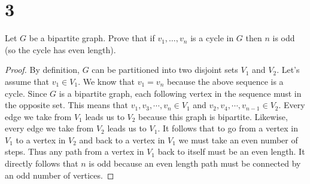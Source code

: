 \documentclass[11pt]{scrartcl}
\begin{document}
\section{3}
Let $G$ be a bipartite graph. Prove that if $v_{1}, \ldots, v_{n}$ is a cycle in $G$ then $n$ is odd (so the cycle has even length).
\begin{proof}
	By definition, $G$ can be partitioned into two disjoint sets $V_1$ and $V_2$. Let's assume that $v_1 \in V_1$.
	We know that $v_1 = v_n$ because the above sequence is a cycle.
	Since $G$ is a bipartite graph, each following vertex in the sequence must in the opposite set.
	This means that $v_1, v_3, \cdots, v_n \in V_1$ and $v_2, v_4, \cdots, v_{n-1} \in V_2$.
	Every edge we take from $V_1$ leads us to $V_2$
	because this graph is bipartite. Likewise, every edge we take from $V_2$ leads us to $V_1$. It follows that
	to go from a vertex in $V_1$ to a vertex in $V_2$ and back to a vertex in $V_1$ we must take an even number of steps.
	Thus any path from a vertex in $V_1$ back to itself must be an even length. It directly follows that
	$n$ is odd because an even length path must be connected by an odd number of vertices.
\end{proof}
\end{document}
